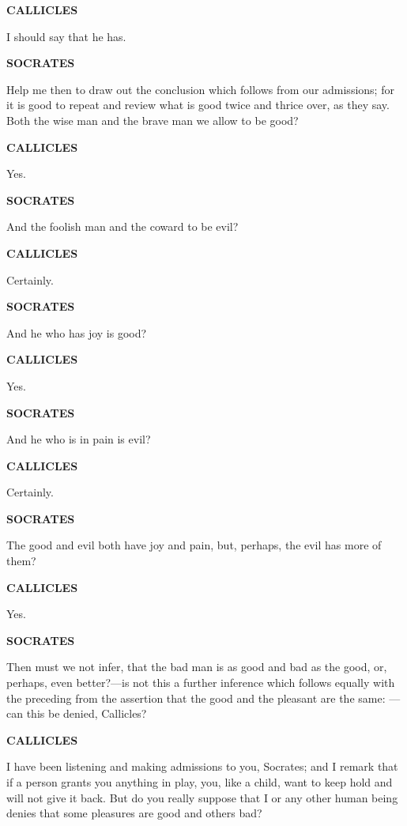 \documentclass[11pt,letter]{article}
\begin{document}
\par \textbf{CALLICLES}
\par   I should say that he has.

\par \textbf{SOCRATES}
\par   Help me then to draw out the conclusion which follows from our admissions; for it is good to repeat and review what is good twice and thrice over, as they say. Both the wise man and the brave man we allow to be good?

\par \textbf{CALLICLES}
\par   Yes.

\par \textbf{SOCRATES}
\par   And the foolish man and the coward to be evil?

\par \textbf{CALLICLES}
\par   Certainly.

\par \textbf{SOCRATES}
\par   And he who has joy is good?

\par \textbf{CALLICLES}
\par   Yes.

\par \textbf{SOCRATES}
\par   And he who is in pain is evil?

\par \textbf{CALLICLES}
\par   Certainly.

\par \textbf{SOCRATES}
\par   The good and evil both have joy and pain, but, perhaps, the evil has more of them?

\par \textbf{CALLICLES}
\par   Yes.

\par \textbf{SOCRATES}
\par   Then must we not infer, that the bad man is as good and bad as the good, or, perhaps, even better?—is not this a further inference which follows equally with the preceding from the assertion that the good and the pleasant are the same: —can this be denied, Callicles?

\par \textbf{CALLICLES}
\par   I have been listening and making admissions to you, Socrates; and I remark that if a person grants you anything in play, you, like a child, want to keep hold and will not give it back. But do you really suppose that I or any other human being denies that some pleasures are good and others bad?
\end{document}
